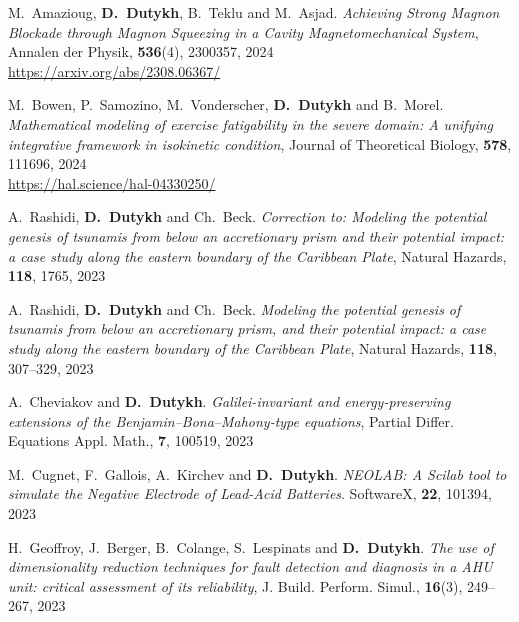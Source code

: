 \begin{etaremune}
  \item M.~Amazioug, \textbf{D.~Dutykh}, B.~Teklu and M.~Asjad. \textit{Achieving Strong Magnon Blockade through Magnon Squeezing in a Cavity Magnetomechanical System}, Annalen der Physik, \textbf{536}(4), 2300357, 2024 \\ %
  \url{https://arxiv.org/abs/2308.06367/}
  
  \item M.~Bowen, P.~Samozino, M.~Vonderscher, \textbf{D.~Dutykh} and B.~Morel. \textit{Mathematical modeling of exercise fatigability in the severe domain: A unifying integrative framework in isokinetic condition}, Journal of Theoretical Biology, \textbf{578}, 111696, 2024 \\ %
  \url{https://hal.science/hal-04330250/}
  
  

  \item A.~Rashidi, \textbf{D.~Dutykh} and Ch.~Beck. \textit{Correction to: Modeling the potential genesis of tsunamis from below an accretionary prism and their potential impact: a case study along the eastern boundary of the Caribbean Plate}, Natural Hazards, \textbf{118}, 1765, 2023 %
  
  \item A.~Rashidi, \textbf{D.~Dutykh} and Ch.~Beck. \textit{Modeling the potential genesis of tsunamis from below an accretionary prism, and their potential impact: a case study along the eastern boundary of the Caribbean Plate}, Natural Hazards, \textbf{118}, 307--329, 2023 %

  \item A.~Cheviakov and \textbf{D.~Dutykh}. \textit{Galilei-invariant and energy-preserving extensions of the Benjamin--Bona--Mahony-type equations}, Partial Differ. Equations Appl. Math., \textbf{7}, 100519, 2023 %

  \item M.~Cugnet, F.~Gallois, A.~Kirchev and \textbf{D.~Dutykh}. \textit{NEOLAB: A Scilab tool to simulate the Negative Electrode of Lead-Acid Batteries}. SoftwareX, \textbf{22}, 101394, 2023 %
  
  \item H.~Geoffroy, J.~Berger, B.~Colange, S.~Lespinats and \textbf{D.~Dutykh}. \textit{The use of dimensionality reduction techniques for fault detection and diagnosis in a AHU unit: critical assessment of its reliability}, J. Build. Perform. Simul., \textbf{16}(3), 249--267, 2023 %


\end{etaremune}
